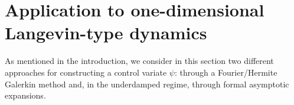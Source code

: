 \documentclass[11pt,a4paper]{article}
\newcommand{\vect}[1]{\boldsymbol{\mathbf #1}}
\theoremstyle{plain}
\numberwithin{equation}{section}
\begin{document}
%

\section{Application to one-dimensional Langevin-type dynamics}%
\label{sec:application_to_one_dimensional_langevin_type_dynamics}

As mentioned in the introduction,
we consider in this section two different approaches for constructing a control variate $\psi$:
through a Fourier/Hermite Galerkin method and,
in the underdamped regime,
through formal asymptotic expansions.
\end{document}
